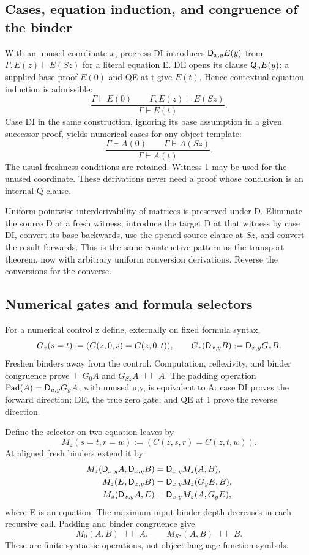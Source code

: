 \subsection{Cases, equation induction, and congruence of the binder}

With an unused coordinate $x$, progress DI introduces $\mathsf D_{x,y}E(y)$
from $\Gamma,E(z)\vdash E(Sz)$ for a literal equation E. DE opens
its clause $\mathsf Q_yE(y)$; a supplied base proof $E(0)$ and QE at t give
$E(t)$. Hence contextual equation induction is admissible:
\[
 \frac{\Gamma\vdash E(0)\qquad\Gamma,E(z)\vdash E(Sz)}
      {\Gamma\vdash E(t)}. \tag{EI}\label{rule:EI}
\]
Case DI in the same construction, ignoring its base assumption in a
given successor proof, yields numerical cases for any object template:
\[
 \frac{\Gamma\vdash A(0)\qquad\Gamma\vdash A(Sz)}
      {\Gamma\vdash A(t)}. \tag{NC}\label{rule:NC}
\]
The usual freshness conditions are retained. Witness 1 may be used
for the unused coordinate. These derivations never need a proof whose
conclusion is an internal Q clause.

Uniform pointwise interderivability of matrices is preserved under D.
Eliminate the source D at a fresh witness, introduce the target D at
that witness by case DI, convert its base backwards, use the opened
source clause at $Sz$, and convert the result forwards. This is the
same constructive pattern as the transport theorem, now with arbitrary
uniform conversion derivations. Reverse the conversions for the converse.

\subsection{Numerical gates and formula selectors}

For a numerical control z define, externally on fixed formula syntax,
\[
 G_z(s=t):=(C(z,0,s)=C(z,0,t)),\qquad
 G_z(\mathsf D_{x,y}B):=\mathsf D_{x,y}G_zB.
\]
Freshen binders away from the control. Computation, reflexivity, and
binder congruence prove $\vdash G_0A$ and $G_{Sz}A\dashv\vdash A$.
The padding operation $\operatorname{Pad}(A)=\mathsf D_{u,y}G_yA$, with
unused u,y, is equivalent to A: case DI proves the forward direction;
DE, the true zero gate, and QE at 1 prove the reverse direction.

Define the selector on two equation leaves by
\[
 M_z(s=t,r=w):=(C(z,s,r)=C(z,t,w)).
\]
At aligned fresh binders extend it by
\begin{align*}
 M_z(\mathsf D_{x,y}A,\mathsf D_{x,y}B)&=\mathsf D_{x,y}M_z(A,B),\\
 M_z(E,\mathsf D_{x,y}B)&=\mathsf D_{x,y}M_z(G_yE,B),\\
 M_z(\mathsf D_{x,y}A,E)&=\mathsf D_{x,y}M_z(A,G_yE),
\end{align*}
where E is an equation. The maximum input binder depth decreases in
each recursive call. Padding and binder congruence give
\[
             M_0(A,B)\dashv\vdash A,\qquad
             M_{Sz}(A,B)\dashv\vdash B.
\]
These are finite syntactic operations, not object-language function symbols.

